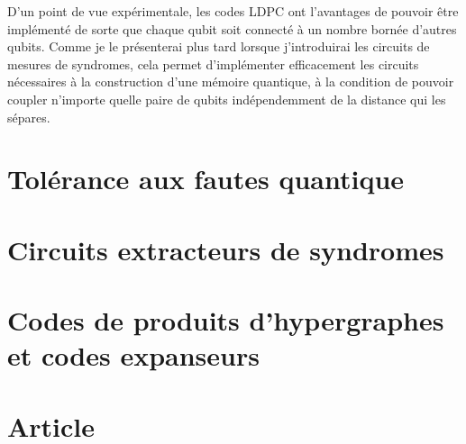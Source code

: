 D'un point de vue expérimentale,
les codes LDPC ont l'avantages de pouvoir être implémenté de sorte que 
chaque qubit soit connecté à un nombre bornée d'autres qubits.
Comme je le présenterai plus tard lorsque j'introduirai les circuits
de mesures de syndromes,
cela permet d'implémenter efficacement les circuits nécessaires à la
construction d'une mémoire quantique,
à la condition de pouvoir coupler n'importe quelle paire de qubits 
indépendemment de la distance qui les sépares.











\section{Tolérance aux fautes quantique}

\section{Circuits extracteurs de syndromes}

\section{Codes de produits d'hypergraphes et codes expanseurs}

\section{Article}



